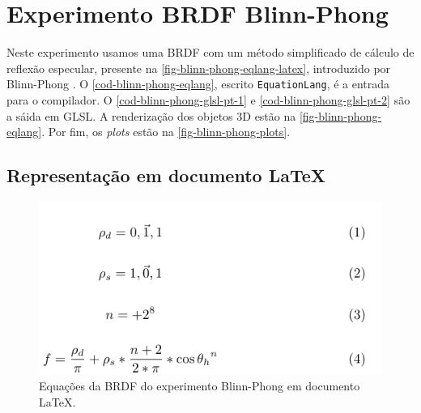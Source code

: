 
\section{Experimento BRDF Blinn-Phong} \label{section-experiment-blinn-phong}

Neste experimento usamos uma BRDF com um método simplificado de cálculo de reflexão especular, presente na \autoref{fig-blinn-phong-eqlang-latex}, introduzido por Blinn-Phong \cite{blinn1977models}. O \autoref{cod-blinn-phong-eqlang}, escrito \texttt{EquationLang}, é a entrada para o compilador. O \autoref{cod-blinn-phong-glsl-pt-1} e \autoref{cod-blinn-phong-glsl-pt-2} são a sáida em GLSL. A renderização dos objetos 3D estão na \autoref{fig-blinn-phong-eqlang}. Por fim, os \textit{plots} estão na \autoref{fig-blinn-phong-plots}.

\subsection{Representação em documento \LaTeX{}}
\begin{figure}[H]
    \caption{\label{fig-blinn-phong-eqlang-latex} 
    \small Equações da BRDF do experimento Blinn-Phong em documento \LaTeX{}.}
    \begin{center}
        \includegraphics[scale=0.92]{./Imagens/brdfs/blinn-phong.pdf}
    \end{center}
\end{figure}


